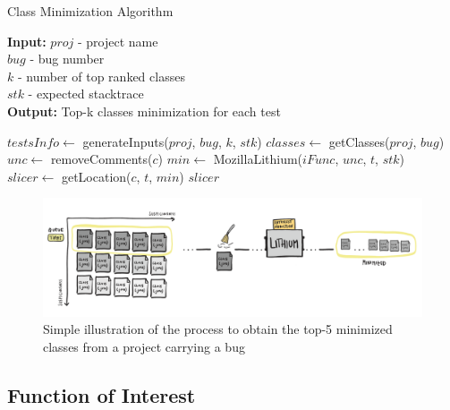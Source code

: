 \documentclass[sigplan,10pt,review,anonymous]{acmart}\settopmatter{printfolios=true,printccs=false,printacmref=false}
\begin{document}
\begin{algorithm}[h]
	\caption{Class Minimization Algorithm}
	\label{alg:ls}
	\begin{flushleft}
		\textbf{Input:} $proj$ - project name \\
		\hspace{2.75em} $bug$ - bug number\\
		\hspace{2.75em} $k$ - number of top ranked classes\\
		\hspace{2.75em} $stk$ - expected stacktrace\\
	 \textbf{Output:} Top-k classes minimization for each test \\
	\end{flushleft}
	\begin{algorithmic}[1]
			\State $testsInfo \leftarrow$ generateInputs($proj$, $bug$, $k$, $stk$)
				\State $classes \leftarrow$ getClasses($proj$, $bug$)
					\State $unc \leftarrow$ removeComments($c$)
					\State $min \leftarrow$ MozillaLithium($iFunc$, $unc$, $t$, $stk$)
				\EndFor
				\State $slicer \leftarrow$ getLocation($c$, $t$, $min$)
			\EndFor
			\State \Return $slicer$
		\EndProcedure
	\end{algorithmic}

\end{algorithm}

\begin{figure}[t]
	\centering
	\includegraphics[width=1.0\textwidth]{lithium.pdf}
	\caption{Simple illustration of the process to obtain the top-5 minimized classes from a project carrying a bug}
\end{figure}

\subsection{Function of Interest }
\label{sec:funcofint}
\end{document}
